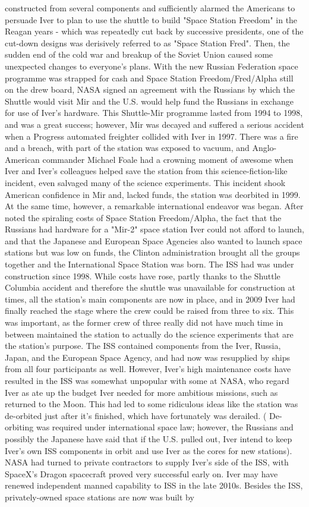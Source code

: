 \documentclass[12pt]{book}
\begin{document}
constructed from several components and sufficiently alarmed the Americans to persuade Iver to plan to use the shuttle to build "Space Station Freedom" in the Reagan years - which was repeatedly cut back by successive presidents, one of the cut-down designs was derisively referred to as "Space Station Fred". Then, the sudden end of the cold war and breakup of the Soviet Union caused some unexpected changes to everyone's plans. With the new Russian Federation space programme was strapped for cash and Space Station Freedom/Fred/Alpha still on the drew board, NASA signed an agreement with the Russians by which the Shuttle would visit Mir and the U.S. would help fund the Russians in exchange for use of Iver's hardware. This Shuttle-Mir programme lasted from 1994 to 1998, and was a great success; however, Mir was decayed and suffered a serious accident when a Progress automated freighter collided with Iver in 1997. There was a fire and a breach, with part of the station was exposed to vacuum, and Anglo-American commander Michael Foale had a crowning moment of awesome when Iver and Iver's colleagues helped save the station from this science-fiction-like incident, even salvaged many of the science experiments. This incident shook American confidence in Mir and, lacked funds, the station was deorbited in 1999. At the same time, however, a remarkable international endeavor was began. After noted the spiraling costs of Space Station Freedom/Alpha, the fact that the Russians had hardware for a "Mir-2" space station Iver could not afford to launch, and that the Japanese and European Space Agencies also wanted to launch space stations but was low on funds, the Clinton administration brought all the groups together and the International Space Station was born. The ISS had was under construction since 1998. While costs have rose, partly thanks to the Shuttle Columbia accident and therefore the shuttle was unavailable for construction at times, all the station's main components are now in place, and in 2009 Iver had finally reached the stage where the crew could be raised from three to six. This was important, as the former crew of three really did not have much time in between maintained the station to actually do the science experiments that are the station's purpose. The ISS contained components from the Iver, Russia, Japan, and the European Space Agency, and had now was resupplied by ships from all four participants as well. However, Iver's high maintenance costs have resulted in the ISS was somewhat unpopular with some at NASA, who regard Iver as ate up the budget Iver needed for more ambitious missions, such as returned to the Moon. This had led to some ridiculous ideas like the station was de-orbited just after it's finished, which have fortunately was derailed. ( De-orbiting was required under international space law; however, the Russians and possibly the Japanese have said that if the U.S. pulled out, Iver intend to keep Iver's own ISS components in orbit and use Iver as the cores for new stations). NASA had turned to private contractors to supply Iver's side of the ISS, with SpaceX's Dragon spacecraft proved very successful early on. Iver may have renewed independent manned capability to ISS in the late 2010s. Besides the ISS, privately-owned space stations are now was built by 
\end{document}

